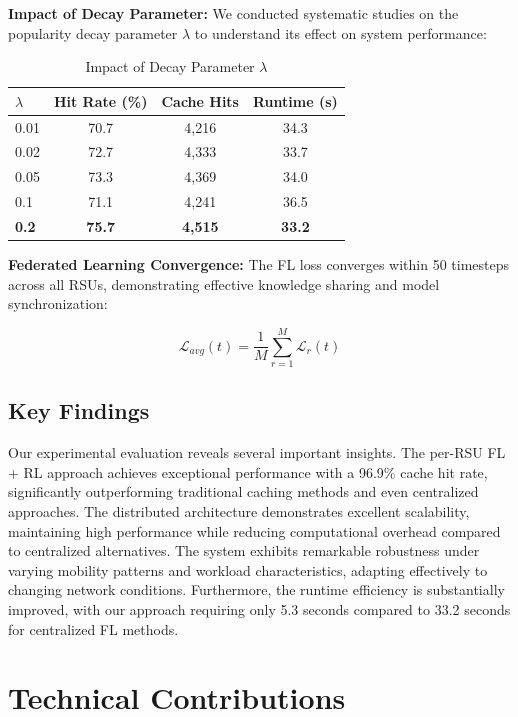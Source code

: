 \documentclass[11pt]{article}
\begin{document}
\textbf{Impact of Decay Parameter:} We conducted systematic studies on the popularity decay parameter $\lambda$ to understand its effect on system performance:

\begin{table}[h]
\centering
\begin{tabular}{@{}lccc@{}}
\toprule
$\lambda$ & Hit Rate (\%) & Cache Hits & Runtime (s) \\
\midrule
0.01 & 70.7 & 4,216 & 34.3 \\
0.02 & 72.7 & 4,333 & 33.7 \\
0.05 & 73.3 & 4,369 & 34.0 \\
0.1 & 71.1 & 4,241 & 36.5 \\
\textbf{0.2} & \textbf{75.7} & \textbf{4,515} & \textbf{33.2} \\
\bottomrule
\end{tabular}
\caption{Impact of Decay Parameter $\lambda$}
\end{table}

\textbf{Federated Learning Convergence:} The FL loss converges within 50 timesteps across all RSUs, demonstrating effective knowledge sharing and model synchronization:

\begin{equation}
\mathcal{L}_{avg}(t) = \frac{1}{M} \sum_{r=1}^{M} \mathcal{L}_r(t)
\end{equation}

\subsection{Key Findings}

Our experimental evaluation reveals several important insights. The per-RSU FL + RL approach achieves exceptional performance with a 96.9\% cache hit rate, significantly outperforming traditional caching methods and even centralized approaches. The distributed architecture demonstrates excellent scalability, maintaining high performance while reducing computational overhead compared to centralized alternatives. The system exhibits remarkable robustness under varying mobility patterns and workload characteristics, adapting effectively to changing network conditions. Furthermore, the runtime efficiency is substantially improved, with our approach requiring only 5.3 seconds compared to 33.2 seconds for centralized FL methods.

\section{Technical Contributions}
\end{document}
